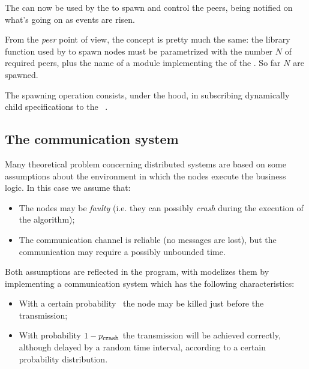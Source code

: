 The  can now be used by the  to spawn
and control the peers, being notified on what's going on as events are
risen.

From the \emph{peer} point of view, the concept is pretty much the same:
the library function used by  to spawn nodes must
be parametrized with the number $N$ of required peers, plus the name of a
module implementing the  of the 
. So far $N$  are
spawned.

The spawning operation consists, under the hood, in subscribing
dynamically child specifications to the  \OTP\
.


\subsection{The communication system} \label{sub:TheCommunicationSystem}

Many theoretical problem concerning distributed systems are based on some
assumptions about the environment in which the nodes execute the business
logic. In this case we assume that:
\begin{itemize}

\item   The nodes may be \emph{faulty} (i.e. they can possibly
        \emph{crash} during the execution of the algorithm);

\item   The communication channel is reliable (no messages are lost),
        but the communication may require a possibly unbounded time.

\end{itemize}

Both assumptions are reflected in the program, with modelizes them by
implementing a communication system which has the following
characteristics:
\begin{itemize}

\item   With a certain probability \PCrash\ the node may be
        killed just before the transmission;

\item   With probability $1 - {p}_{\mbox{\footnotesize{crash}}}$ the transmission will
        be achieved correctly, although delayed by a random time interval,
        according to a certain probability distribution.

\end{itemize}

